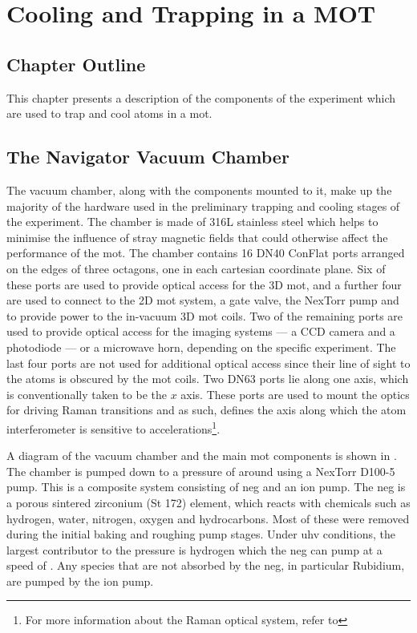 \chapter{Cooling and Trapping in a MOT}
\section{Chapter Outline}
This chapter presents a description of the components of the experiment which are used to trap and cool atoms in a \ac{mot}. 
\section{The Navigator Vacuum Chamber}\label{sec:vacuum_chamber}
The vacuum chamber, along with the components mounted to it, make up the majority of the hardware used in the preliminary trapping and cooling stages of the experiment. The chamber is made of 316L stainless steel which helps to minimise the influence of stray magnetic fields that could otherwise affect the performance of the \ac{mot}. The chamber contains 16 DN40 ConFlat ports arranged on the edges of three octagons, one in each cartesian coordinate plane. Six of these ports are used to provide optical access for the 3D \ac{mot}, and a further four are used to connect to the 2D \ac{mot} system, a gate valve, the NexTorr pump and to provide power to the in-vacuum 3D \ac{mot} coils. Two of the remaining ports are used to provide optical access for the imaging systems --- a CCD camera and a photodiode --- or a microwave horn, depending on the specific experiment. The last four ports are not used for additional optical access since their line of sight to the atoms is obscured by the \ac{mot} coils. Two DN63 ports lie along one axis, which is conventionally taken to be the \(x\) axis. These ports are used to mount the optics for driving Raman transitions and as such, defines the axis along which the atom interferometer is sensitive to accelerations\footnote{For more information about the Raman optical system, refer to }. \par\noindent
A diagram of the vacuum chamber and the main \ac{mot} components is shown in . The chamber is pumped down to a pressure of around \sivalue{}{\milli\bar} using a NexTorr D100-5 pump. This is a composite system consisting of \ac{neg} and an ion pump. The \ac{neg} is a porous sintered zirconium (St 172) element, which reacts with chemicals such as hydrogen, water, nitrogen, oxygen and hydrocarbons. Most of these were removed during the initial baking and roughing pump stages. Under \ac{uhv} conditions, the largest contributor to the pressure is hydrogen which the \ac{neg} can pump at a speed of . Any species that are not absorbed by the \ac{neg}, in particular Rubidium, are pumped by the  ion pump.
